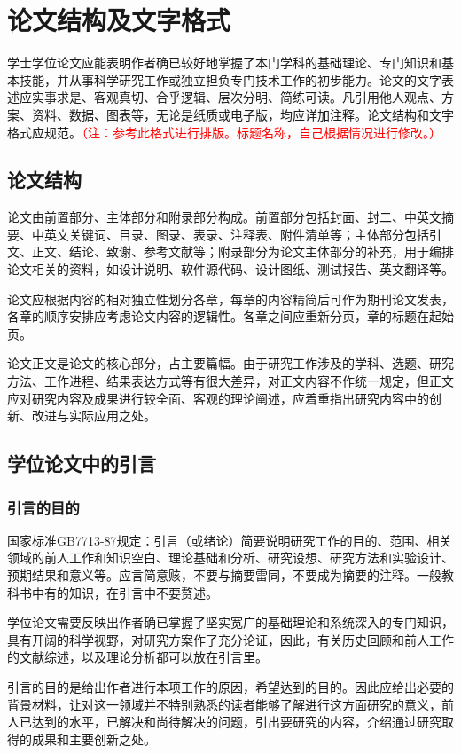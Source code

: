 
\chapter{论文结构及文字格式}
学士学位论文应能表明作者确已较好地掌握了本门学科的基础理论、专门知识和基本技能，并从事科学研究工作或独立担负专门技术工作的初步能力。论文的文字表述应实事求是、客观真切、合乎逻辑、层次分明、简练可读。凡引用他人观点、方案、资料、数据、图表等，无论是纸质或电子版，均应详加注释。论文结构和文字格式应规范。\textcolor{red}{（注：参考此格式进行排版。标题名称，自己根据情况进行修改。）}
\section{论文结构}
论文由前置部分、主体部分和附录部分构成。前置部分包括封面、封二、中英文摘要、中英文关键词、目录、图录、表录、注释表、附件清单等；主体部分包括引文、正文、结论、致谢、参考文献等；附录部分为论文主体部分的补充，用于编排论文相关的资料，如设计说明、软件源代码、设计图纸、测试报告、英文翻译等。

论文应根据内容的相对独立性划分各章，每章的内容精简后可作为期刊论文发表，各章的顺序安排应考虑论文内容的逻辑性。各章之间应重新分页，章的标题在起始页。

论文正文是论文的核心部分，占主要篇幅。由于研究工作涉及的学科、选题、研究方法、工作进程、结果表达方式等有很大差异，对正文内容不作统一规定，但正文应对研究内容及成果进行较全面、客观的理论阐述，应着重指出研究内容中的创新、改进与实际应用之处。


\section{学位论文中的引言}
\subsection{引言的目的}
国家标准GB7713-87规定：引言（或绪论）简要说明研究工作的目的、范围、相关领域的前人工作和知识空白、理论基础和分析、研究设想、研究方法和实验设计、预期结果和意义等。应言简意赅，不要与摘要雷同，不要成为摘要的注释。一般教科书中有的知识，在引言中不要赘述。

学位论文需要反映出作者确已掌握了坚实宽广的基础理论和系统深入的专门知识，具有开阔的科学视野，对研究方案作了充分论证，因此，有关历史回顾和前人工作的文献综述，以及理论分析都可以放在引言里。

引言的目的是给出作者进行本项工作的原因，希望达到的目的。因此应给出必要的背景材料，让对这一领域并不特别熟悉的读者能够了解进行这方面研究的意义，前人已达到的水平，已解决和尚待解决的问题，引出要研究的内容，介绍通过研究取得的成果和主要创新之处。



